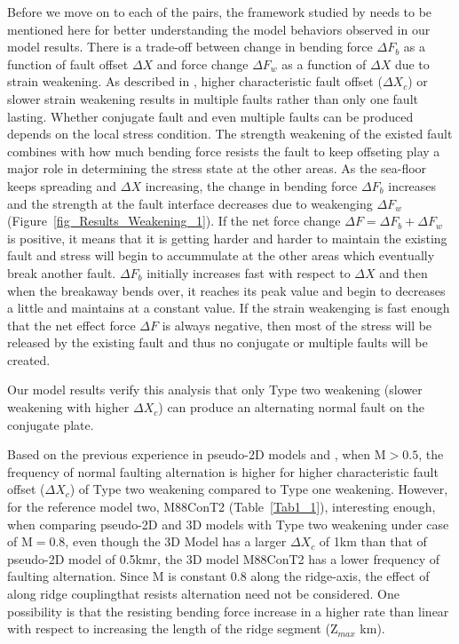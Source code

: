 Before we move on to each of the pairs, the framework studied by \citep{Lavier2000} needs to be mentioned here for better understanding the model behaviors observed in our model results. There is a trade-off between change in bending force $\Delta F_{b}$ as a function of fault offset $\Delta X$ and force change $\Delta F_{w}$ as a function of  $\Delta X$ due to strain weakening. As described in \citep{Lavier2000}, higher characteristic fault offset ($\Delta X_{c}$) or slower strain weakening results in multiple faults rather than only one fault lasting. Whether conjugate fault and even multiple faults can be produced depends on the local stress condition. The strength weakening of the existed fault combines with how much bending force resists the fault to keep offseting play a major role in determining the stress state at the other areas. As the sea-floor keeps spreading and  $\Delta X$ increasing, the change in bending force $\Delta F_{b}$ increases and the strength at the fault interface decreases due to weakenging $\Delta F_{w}$ (Figure~\hyperref[fig_Results_Weakening_1]{\ref{fig_Results_Weakening_1}}). If the net force change $\Delta F = \Delta F_{b}+ \Delta F_{w}$ is positive, it means that it is getting harder and harder to maintain the existing fault and stress will begin to accummulate at the other areas which eventually break another fault. $\Delta F_{b}$ initially increases fast with respect to $\Delta X$ and then when the breakaway bends over, it reaches its peak value and begin to decreases a little and maintains at a constant value. If the strain weakenging is fast enough that the net effect force $\Delta F$ is always negative, then most of the stress will be released by the existing fault and thus no conjugate or multiple faults will be created. 

Our model results verify this analysis that only Type two weakening (slower weakening with higher $\Delta X_{c}$) can produce an alternating normal fault on the conjugate plate.

Based on the previous experience in pseudo-2D models and \citep{Lavier2000},  when M$>0.5$, the frequency of normal faulting alternation is higher for higher characteristic fault offset ($\Delta X_{c}$) of Type two weakening compared to Type one weakening. However, for the reference model two, M88ConT2 (Table~\hyperref[Tab1_1]{\ref{Tab1_1}}), interesting enough, when comparing pseudo-2D and 3D models with Type two weakening under case of M$=0.8$, even though the 3D Model has a larger $\Delta X_{c}$ of 1km than that of pseudo-2D model of 0.5kmr, the 3D model M88ConT2 has a lower frequency of faulting alternation. Since M is constant 0.8 along the ridge-axis, the effect of along ridge couplingthat resists alternation need not be considered. One possibility is that the resisting bending force increase in a higher rate than linear with respect to increasing the length of the ridge segment (Z$_{max}$ km).  
